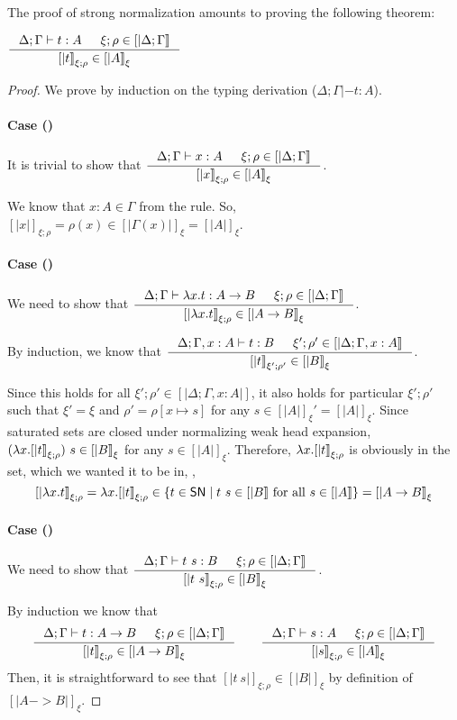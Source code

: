 The proof of strong normalization amounts to proving the following theorem:
\begin{theorem}
$ \inference{\Delta;\Gamma|- t:A & \xi;\rho \in [|\Delta;\Gamma|]}
	    {[|t|]_{\xi;\rho} \in [|A|]_\xi} $
\end{theorem}
\begin{proof}
We prove by induction on the typing derivation ($\Delta;\Gamma|- t:A$).
\paragraph{Case ()}
It is trivial to show that
$ \inference{\Delta;\Gamma |- x:A & \xi;\rho \in [|\Delta;\Gamma|]}
	{[|x|]_{\xi;\rho} \in [|A|]_\xi} $.

We know that $x:A \in \Gamma$ from the  rule.
So, $[|x|]_{\xi;\rho} =\rho(x)\in[|\Gamma(x)|]_\xi = [|A|]_\xi$.

\paragraph{Case ()}
We need to show that
$ \inference{\Delta;\Gamma |- \l x.t : A -> B & \xi;\rho \in [|\Delta;\Gamma|]}
	{[|\l x.t|]_{\xi;\rho} \in [|A -> B|]_\xi} $.

By induction, we know that
$ \inference{\Delta;\Gamma,x:A |- t : B & \xi';\rho' \in [|\Delta;\Gamma,x:A|]}
	     {[|t|]_{\xi';\rho'} \in [|B|]_\xi} $.

Since this holds for all $\xi';\rho' \in [|\Delta;\Gamma,x:A|]$, it also holds
for particular $\xi';\rho'$ such that $\xi'=\xi$ and
$\rho' = \rho[x \mapsto s]$ for any $s \in [|A|]_\xi' = [|A|]_\xi$.
Since saturated sets are closed under normalizing weak head expansion,
$(\lambda x.[|t|]_{\xi;\rho})~s \in[|B|]_\xi$ for any $s\in[|A|]_\xi$.
Therefore, $\lambda x.[|t|]_{\xi;\rho}$ is obviously in the set,
which we wanted it to be in, \ie,
\[ [|\lambda x.t|]_{\xi;\rho} = \lambda x.[|t|]_{\xi;\rho}
   \in \{t\in \mathsf{SN} \mid t~s\in[|B|] ~\text{for all}~ s\in[|A|]\} 
 = [|A -> B|]_\xi \]

\paragraph{Case ()}
We need to show that
$ \inference{\Delta;\Gamma |- t~s : B & \xi;\rho\in[|\Delta;\Gamma|]}{[|t~s|]_{\xi;\rho} \in [|B|]_\xi} $.

By induction we know that
\[
\inference{\Delta;\Gamma |- t : A -> B & \xi;\rho\in[|\Delta;\Gamma|]}{[|t|]_{\xi;\rho} \in [|A -> B|]_\xi}
\qquad
\inference{\Delta;\Gamma |- s : A & \xi;\rho\in[|\Delta;\Gamma|]}{[|s|]_{\xi;\rho} \in [|A|]_\xi}
\]
Then, it is straightforward to see that $[|t~s|]_{\xi;\rho}\in[|B|]_\xi$
by definition of $[|A -> B|]_\xi$.


\end{proof}
